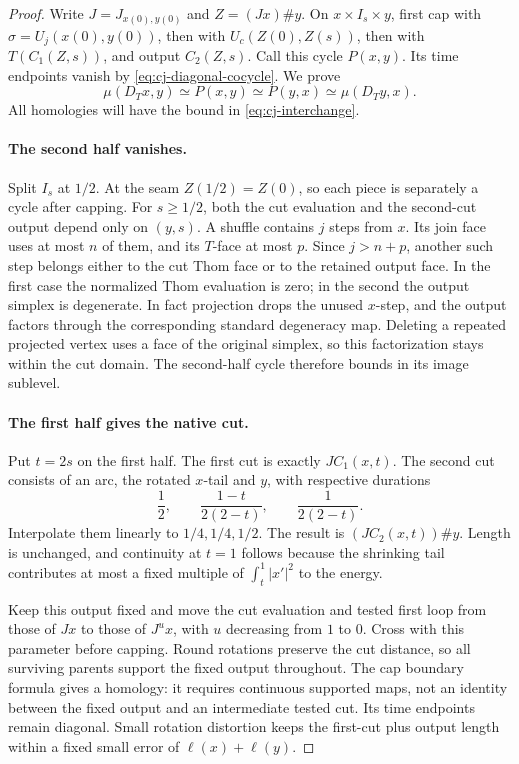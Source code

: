 \begin{proof}
Write $J=J_{x(0),y(0)}$ and $Z=(Jx)\#y$.  On
$x\times I_s\times y$, first cap with
$\sigma=U_j(x(0),y(0))$, then with
$U_c(Z(0),Z(s))$, then with $T(C_1(Z,s))$, and output
$C_2(Z,s)$.  Call this cycle $P(x,y)$.  Its time endpoints
vanish by \eqref{eq:cj-diagonal-cocycle}.  We prove
\begin{equation}\label{eq:cj-three-comparisons}
 \mu(D_Tx,y)\simeq P(x,y)\simeq P(y,x)
                   \simeq\mu(D_Ty,x).
\end{equation}
All homologies will have the bound in \eqref{eq:cj-interchange}.

\paragraph{The second half vanishes.}
Split $I_s$ at $1/2$.  At the seam $Z(1/2)=Z(0)$, so each
piece is separately a cycle after capping.  For $s\ge1/2$, both
the cut evaluation and the second-cut output depend only on
$(y,s)$.  A shuffle contains $j$ steps from $x$.  Its join face
uses at most $n$ of them, and its $T$-face at most $p$.
Since $j>n+p$, another such step belongs either to the cut Thom
face or to the retained output face.  In the first case the
normalized Thom evaluation is zero; in the second the output
simplex is degenerate.  In fact projection drops the unused
$x$-step, and the output factors through the corresponding
standard degeneracy map.  Deleting a repeated projected vertex
uses a face of the original simplex, so this factorization stays
within the cut domain.  The second-half cycle therefore bounds
in its image sublevel.

\paragraph{The first half gives the native cut.}
Put $t=2s$ on the first half.  The first cut is exactly
$JC_1(x,t)$.  The second cut consists of an arc, the rotated
$x$-tail and $y$, with respective durations
\[
 \frac12,\qquad\frac{1-t}{2(2-t)},\qquad\frac1{2(2-t)}.
\]
Interpolate them linearly to $1/4,1/4,1/2$.  The result is
$(JC_2(x,t))\#y$.  Length is unchanged, and continuity at
$t=1$ follows because the shrinking tail contributes at most
a fixed multiple of $\int_t^1|x'|^2$ to the energy.

Keep this output fixed and move the cut evaluation and tested
first loop from those of $Jx$ to those of $J^u x$, with $u$
decreasing from $1$ to $0$.  Cross with this parameter before
capping.  Round rotations preserve the cut distance, so all
surviving parents support the fixed output throughout.  The cap
boundary formula gives a homology: it requires continuous
supported maps, not an identity between the fixed output and an
intermediate tested cut.  Its time endpoints remain diagonal.
Small rotation distortion keeps the first-cut plus output length
within a fixed small error of $\ell(x)+\ell(y)$.


\end{proof}

